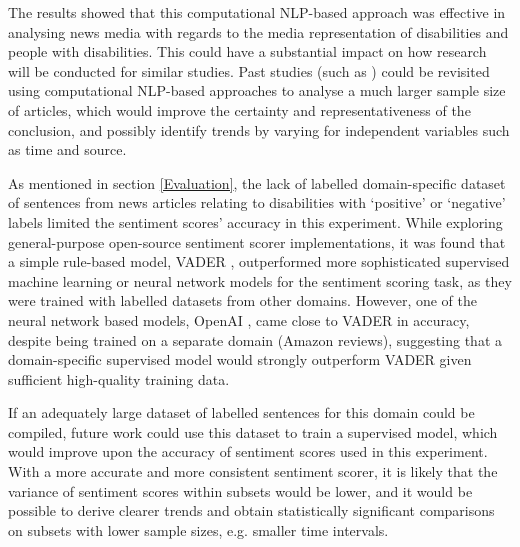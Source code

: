 \documentclass{report}
\begin{document}
The results showed that this computational NLP-based approach was effective in analysing news media with regards to the media representation of disabilities and people with disabilities.
This could have a substantial impact on how research will be conducted for similar studies.
Past studies (such as \cite{gold1999media, coverdale2002depictions, jones2009representations, devotta2013representations}) could be revisited using computational NLP-based approaches to analyse a much larger sample size of articles, which would improve the certainty and representativeness of the conclusion, and possibly identify trends by varying for independent variables such as time and source.

As mentioned in section \ref{Evaluation}, the lack of labelled domain-specific dataset of sentences from news articles relating to disabilities with `positive' or `negative' labels limited the sentiment scores' accuracy in this experiment.
While exploring general-purpose open-source sentiment scorer implementations, it was found that a simple rule-based model, VADER \cite{VADER}, outperformed more sophisticated supervised machine learning or neural network models for the sentiment scoring task, as they were trained with labelled datasets from other domains.
However, one of the neural network based models, OpenAI \cite{OpenAI}, came close to VADER in accuracy, despite being trained on a separate domain (Amazon reviews), suggesting that a domain-specific supervised model would strongly outperform VADER given sufficient high-quality training data.

If an adequately large dataset of labelled sentences for this domain could be compiled, future work could use this dataset to train a supervised model, which would improve upon the accuracy of sentiment scores used in this experiment.
With a more accurate and more consistent sentiment scorer, it is likely that the variance of sentiment scores within subsets would be lower, and it would be possible to derive clearer trends and obtain statistically significant comparisons on subsets with lower sample sizes, e.g. smaller time intervals.
\end{document}
